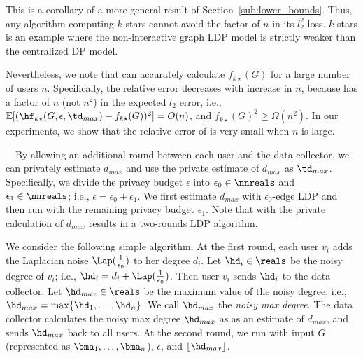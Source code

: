 This is a corollary of a more general result of Section~\ref{sub:lower_bounds}. Thus,
any algorithm computing $k$-stars cannot avoid the factor of $n$ in its $l_2^2$
loss. $k$-stars 
is an example where the non-interactive graph LDP model is strictly weaker than
the centralized DP model.

Nevertheless, we note that  can accurately calculate $f_{k\star}(G)$ for a large number of users $n$. 
Specifically, the relative error decreases with increase in $n$, because  has a factor of $n$ (not $n^2$) in the expected $l_2$ error, i.e., $\mathbb{E}[(\hf_{k\star}(G, \epsilon, \td_{max}) - f_{k\star}(G))^2] = O(n)$, 
and $f_{k\star}(G)^2 \geq \Omega(n^2)$. 
In our experiments, we show that the relative error of  is very small when $n$ is large.

\smallskip
{}~~By allowing an additional round between each user and the data collector, we can privately estimate $d_{max}$ and use the private estimate of $d_{max}$ as $\td_{max}$. 
Specifically, 
we divide the privacy budget $\epsilon$ into 
$\epsilon_0 \in \nnreals$ and $\epsilon_1 \in \nnreals$; i.e., $\epsilon = \epsilon_0 + \epsilon_1$. 
We first estimate $d_{max}$ with $\epsilon_0$-edge LDP and then run  with the remaining privacy budget $\epsilon_1$. 
Note that  with the private calculation of $d_{max}$ results in a two-rounds LDP algorithm.

We consider the following simple algorithm. 
At the first round, 
each user $v_i$ adds the Laplacian noise $\Lap(\frac{1}{\epsilon_0})$ to her degree $d_i$. 
Let $\hd_i \in \reals$ be the noisy degree of $v_i$; i.e., $\hd_i = d_i + \Lap(\frac{1}{\epsilon_0})$. 
Then user $v_i$ sends $\hd_i$ to the data collector. 
Let $\hd_{max} \in \reals$ be the maximum value of the noisy degree; i.e., $\hd_{max} = \max\{\hd_1, \ldots, \hd_n\}$. 
We call $\hd_{max}$ the \textit{noisy max degree}. 
The data collector calculates the noisy max degree $\hd_{max}$ as 
as an estimate of $d_{max}$, 
and sends $\hd_{max}$ back to all users. 
At the second round, we run  
with input $G$ (represented as $\bma_1, \ldots, \bma_n$), $\epsilon$, and $\lfloor \hd_{max} \rfloor$.

